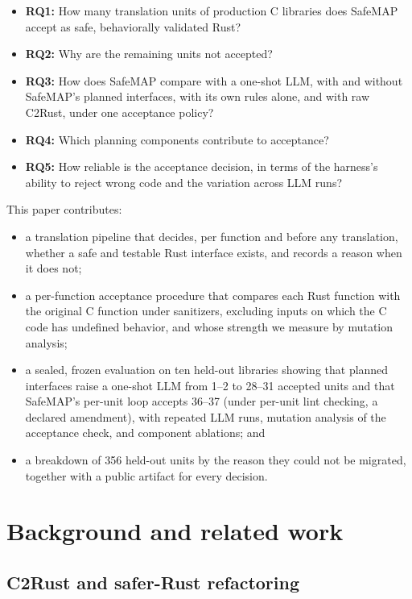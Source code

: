 \documentclass[pdflatex,sn-basic]{sn-jnl}
\newcommand{\tool}{SafeMAP\xspace}
\begin{document}
\begin{itemize}
  \item \textbf{RQ1:} How many translation units of production C libraries
  does \tool accept as safe, behaviorally validated Rust?
  \item \textbf{RQ2:} Why are the remaining units not accepted?
  \item \textbf{RQ3:} How does \tool compare with a one-shot LLM, with and
  without \tool's planned interfaces, with its own rules alone, and with raw
  C2Rust, under one acceptance policy?
  \item \textbf{RQ4:} Which planning components contribute to acceptance?
  \item \textbf{RQ5:} How reliable is the acceptance decision, in terms of
  the harness's ability to reject wrong code and the variation across LLM
  runs?
\end{itemize}

This paper contributes:

\begin{itemize}
  \item a translation pipeline that decides, per function and before any
  translation, whether a safe and testable Rust interface exists, and records
  a reason when it does not;
  \item a per-function acceptance procedure that compares each Rust function
  with the original C function under sanitizers, excluding inputs on which the
  C code has undefined behavior, and whose strength we measure by mutation
  analysis;
  \item a sealed, frozen evaluation on ten held-out libraries showing that
  planned interfaces raise a one-shot LLM from 1--2 to 28--31 accepted units
  and that \tool's per-unit loop accepts 36--37 (under per-unit lint checking,
  a declared amendment), with repeated LLM runs, mutation analysis of the
  acceptance check, and component ablations; and
  \item a breakdown of 356 held-out units by the reason they could not be
  migrated, together with a public artifact for every decision.
\end{itemize}

\section{Background and related work}

\subsection{C2Rust and safer-Rust refactoring}
\end{document}
